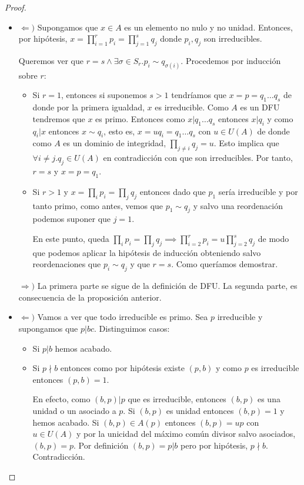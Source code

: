 \begin{proof}
\begin{itemize}
\item $\Leftarrow)$ Supongamos que $x \in A$ es un elemento no nulo y no unidad. Entonces, por hipótesis, $x = \prod_{i = 1}^r p_i = \prod_{j = 1}^s q_j$ donde $p_i,q_j$ son irreducibles. 

Queremos ver que $r = s \land \exists \sigma \in S_r.p_i \sim q_{\sigma(i)}$. Procedemos por inducción sobre $r$:

\begin{itemize}
\item Si $r = 1$, entonces si suponemos $s > 1$ tendríamos que $x = p = q_1 \ldots q_s$ de donde por la primera igualdad, $x$ es irreducible. Como $A$ es un DFU tendremos que $x$ es primo. Entonces como $x|q_1 \ldots q_s$ entonces $x |q_i$ y como $q_i|x$ entonces $x \sim q_i$, esto es, $x = uq_i = q_1 \ldots q_s$ con $u \in U(A)$ de donde como $A$ es un dominio de integridad, $\prod_{j \neq i} q_j = u$. Esto implica que $\forall i \neq j.q_j \in U(A)$ en contradicción con que son irreducibles. Por tanto, $r = s$ y $x = p = q_1$.

\item Si $r > 1$ y $x = \prod_i p_i = \prod_j q_j$ entonces dado que $p_1$ sería irreducible y por tanto primo, como antes, vemos que $p_1 \sim q_j$ y salvo una reordenación podemos suponer que $j = 1$. 

En este punto, queda $\prod_i p_i = \prod_j q_j \implies \prod_{i = 2}^r p_i = u \prod_{j = 2}^s q_j$ de modo que podemos aplicar la hipótesis de inducción obteniendo salvo reordenaciones que $p_i \sim q_j$ y que $r = s$. Como queríamos demostrar. 
\end{itemize}

$\Rightarrow)$ La primera parte se sigue de la definición de DFU. La segunda parte, es consecuencia de la proposición anterior.

\item $\Leftarrow)$ Vamos a ver que todo irreducible es primo. Sea $p$ irreducible y supongamos que $p|bc$. Distinguimos casos:

\begin{itemize}
\item Si $p|b$ hemos acabado. 
\item Si $p \nmid b$ entonces como por hipótesis existe $(p,b)$ y como $p$ es irreducible entonces $(p,b) = 1$.

En efecto, como $(b,p)|p$ que es irreducible, entonces $(b,p)$ es una unidad o un asociado a $p$. Si $(b,p)$ es unidad entonces $(b,p) = 1$ y hemos acabado. Si $(b,p) \in A(p)$ entonces $(b,p) = up$ con $u \in U(A)$ y por la unicidad del máximo común divisor salvo asociados, $(b,p) = p$. Por definición $(b,p) = p | b$ pero por hipótesis, $p \nmid b$. Contradicción.  


\end{itemize}
\end{itemize}
\end{proof}
